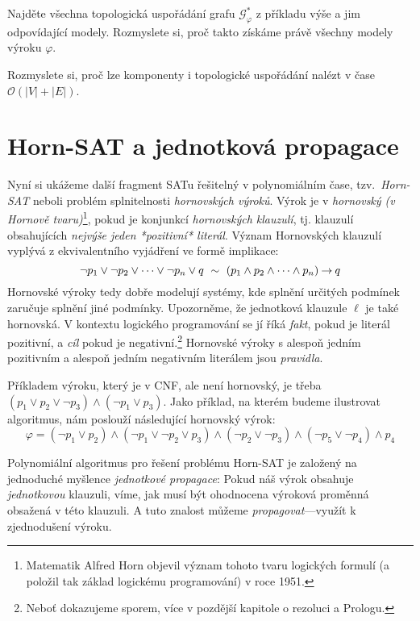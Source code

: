 \begin{exercise}
    Najděte všechna topologická uspořádání grafu $\mathcal G_\varphi^\ast$ z příkladu výše a jim odpovídající modely. Rozmyslete si, proč takto získáme právě všechny modely výroku $\varphi$.
\end{exercise}

\begin{exercise}
    Rozmyslete si, proč lze komponenty i topologické uspořádání nalézt v čase $\mathcal O(|V|+|E|)$.
\end{exercise}

\section{Horn-SAT a jednotková propagace}\label{section:horn-sat}

Nyní si ukážeme další fragment SATu řešitelný v polynomiálním čase, tzv.\ \emph{Horn-SAT} neboli problém splnitelnosti \emph{hornovských výroků}. Výrok je v \emph{hornovský (v Hornově tvaru)}\footnote{Matematik Alfred Horn objevil význam tohoto tvaru logických formulí (a položil tak základ logickému programování) v roce 1951.}, pokud je konjunkcí \emph{hornovských klauzulí}, tj. klauzulí obsahujících \emph{nejvýše jeden *pozitivní* literál}. Význam Hornovských klauzulí vyplývá z ekvivalentního vyjádření ve formě implikace:
$$
\neg p_1\lor \neg p_2\lor \dots \lor \neg p_n\lor q\ \sim\ (p_1\land p_2\land\dots \land p_n)\mathbin{\rightarrow} q
$$
Hornovské výroky tedy dobře modelují systémy, kde splnění určitých podmínek zaručuje splnění jiné podmínky. Upozorněme, že jednotková klauzule $\ell$ je také hornovská. V kontextu logického programování se jí říká \emph{fakt}, pokud je literál pozitivní, a \emph{cíl} pokud je negativní.\footnote{Neboť dokazujeme sporem, více v pozdější kapitole o rezoluci a Prologu.} Hornovské výroky s alespoň jedním pozitivním a alespoň jedním negativním literálem jsou \emph{pravidla}. 

\begin{example}
    Příkladem výroku, který je v CNF, ale není hornovský, je třeba $(p_1\lor p_2\lor\neg p_3)\land (\neg p_1\lor p_3)$. Jako příklad, na kterém budeme ilustrovat algoritmus, nám poslouží následující hornovský výrok:
    $$
    \varphi=(\neg p_1\lor p_2)\land(\neg p_1\lor\neg p_2\lor p_3)\land(\neg p_2\lor\neg p_3)\land(\neg p_5\lor \neg p_4)\land p_4
    $$
\end{example}

Polynomiální algoritmus pro řešení problému Horn-SAT je založený na jednoduché myšlence \emph{jednotkové propagace}: Pokud náš výrok obsahuje \emph{jednotkovou} klauzuli, víme, jak musí být ohodnocena výroková proměnná obsažená v této klauzuli. A tuto znalost můžeme \emph{propagovat}---využít k zjednodušení výroku. 

